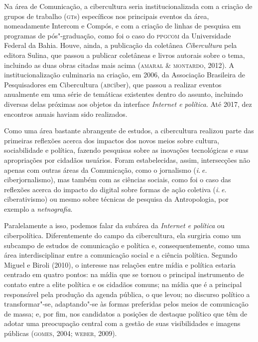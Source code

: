 Na área de Comunicação, a cibercultura seria institucionalizada com a
criação de grupos de trabalho (\textsc{gt}s) específicos nos principais eventos
da área, nomeadamente Intercom e Compós, e com a criação de linhas de
pesquisa em programas de pós"-graduação, como foi o caso do \textsc{ppgcom} da
Universidade Federal da Bahia. Houve, ainda, a publicação da coletânea
\textit{Cibercultura} pela editora Sulina, que passou a publicar coletâneas e
livros autorais sobre o tema, incluindo as duas obras citadas mais acima
(\textsc{amaral \& montardo}, 2012). A institucionalização culminaria na criação,
em 2006, da Associação Brasileira de Pesquisadores em Cibercultura
(\textsc{abc}iber), que passou a realizar eventos anualmente em uma série de
temáticas existentes dentro do assunto, incluindo diversas delas
próximas aos objetos da interface \textit{Internet e política}. Até 2017, dez
encontros anuais haviam sido realizados.

Como uma área bastante abrangente de estudos, a cibercultura realizou
parte das primeiras reflexões acerca dos impactos dos novos meios sobre
cultura, sociabilidade e política, fazendo pesquisas sobre as inovações
tecnológicas e suas apropriações por cidadãos usuários. Foram
estabelecidas, assim, intersecções não apenas com outras áreas da
Comunicação, como o jornalismo (\textit{i.\,e.} ciberjornalismo), mas também com as
ciências sociais, como foi o caso das reflexões acerca do impacto do
digital sobre formas de ação coletiva (\textit{i.\,e.} ciberativismo) ou mesmo
sobre técnicas de pesquisa da Antropologia, por exemplo a \textit{netnografia}.

Paralelamente a isso, podemos falar da subárea da \textit{Internet e política} 
ou ciberpolítica. Diferentemente do campo da cibercultura,
ela surgiria como um subcampo de estudos de comunicação e política e,
consequentemente, como uma área interdisciplinar entre a comunicação
social e a ciência política. Segundo Miguel e Biroli (2010), o interesse
nas relações entre mídia e política estaria centrado em quatro pontos:
na mídia que se tornou o principal instrumento de contato entre a elite
política e os cidadãos comuns; na mídia que é a principal responsável pela
produção da agenda pública, o que levou; no discurso político a
transformar"-se, adaptando"-se às formas preferidas pelos meios de
comunicação de massa; e, por fim, nos candidatos a posições de destaque político que
têm de adotar uma preocupação central com a gestão de suas visibilidades
e imagens públicas (\textsc{gomes}, 2004; \textsc{weber}, 2009).

